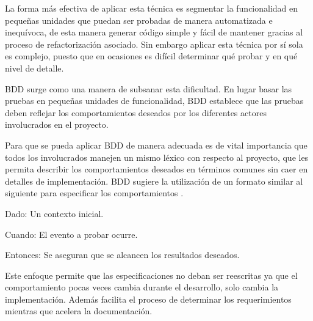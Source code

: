 La forma más efectiva de aplicar esta técnica es segmentar la funcionalidad en pequeñas unidades que puedan ser probadas de manera automatizada e inequívoca, de esta manera generar código simple y fácil de mantener gracias al proceso de refactorización asociado. Sin embargo aplicar esta técnica por sí sola es complejo, puesto que en ocasiones es difícil determinar qué probar y en qué nivel de detalle.

BDD surge como una manera de subsanar esta dificultad. En lugar basar las pruebas en pequeñas unidades de funcionalidad, BDD establece que las pruebas deben reflejar los comportamientos deseados por los diferentes actores involucrados en el proyecto. 

Para que se pueda aplicar BDD de manera adecuada es de vital importancia que todos los involucrados manejen un mismo léxico con respecto al proyecto, que les permita describir los comportamientos deseados en términos comunes sin caer en detalles de implementación. BDD sugiere la utilización de un formato similar al siguiente para especificar los comportamientos \cite{IBDD}.

Dado: Un contexto inicial.

Cuando: El evento a probar ocurre.

Entonces: Se aseguran que se alcancen los resultados deseados.

Este enfoque permite que las especificaciones no deban ser reescritas ya que el comportamiento pocas veces cambia durante el desarrollo, solo cambia la implementación. Además facilita el proceso de determinar los requerimientos mientras que acelera la documentación.



 

